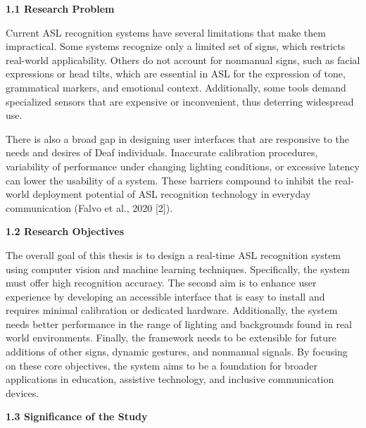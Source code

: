\documentclass[12pt]{article}
\begin{document}
\vspace{1.5em}
\noindent
\textbf{1.1 Research Problem}
\vspace{1.5em}

Current ASL recognition systems have several limitations that make them impractical. Some systems 
recognize only a limited set of signs, which restricts real-world applicability. Others do not 
account for nonmanual signs, such as facial expressions or head tilts, which are essential in ASL 
for the expression of tone, grammatical markers, and emotional context. Additionally, some tools 
demand specialized sensors that are expensive or inconvenient, thus deterring widespread use.

There is also a broad gap in designing user interfaces that are responsive to the needs and desires 
of Deaf individuals. Inaccurate calibration procedures, variability of performance under changing 
lighting conditions, or excessive latency can lower the usability of a system. These barriers 
compound to inhibit the real-world deployment potential of ASL recognition technology in everyday 
communication (Falvo et al., 2020 [2]).

\vspace{1.5em}
\noindent
\textbf{1.2 Research Objectives}
\vspace{1.5em}

The overall goal of this thesis is to design a real-time ASL recognition system using computer 
vision and machine learning techniques. Specifically, the system must offer high recognition 
accuracy. The second aim is to enhance user experience by developing an accessible interface that 
is easy to install and requires minimal calibration or dedicated hardware. Additionally, the system 
needs better performance in the range of lighting and backgrounds found in real world environments. Finally, the framework needs to be extensible 
for future additions of other signs, dynamic gestures, and nonmanual signals. By focusing on these 
core objectives, the system aims to be a foundation for broader applications in education, assistive 
technology, and inclusive communication devices.

\vspace{1.5em}
\noindent
\textbf{1.3 Significance of the Study}
\vspace{1.5em}
\end{document}
